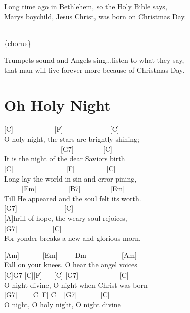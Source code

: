 \documentclass[
  letterpaper,
  twoside=false]{scrbook}
\begin{document}
Long time ago in Bethlehem, so the Holy Bible says, ~\\
Mary\textquotesingle s boychild, Jesus Christ, was born on Christmas
Day.

~\\
\{chorus\}

Trumpets sound and Angels sing...listen to what they say,\\
that man will live forever more because of Christmas Day.

\hypertarget{oh-holy-night}{%
\chapter{Oh Holy Night}\label{oh-holy-night}}

{[}C{]} ~ ~ ~ ~ ~ ~ ~{[}F{]} ~ ~ ~ ~ ~ ~ ~ ~{[}C{]}\\
O holy night, the stars are brightly shining;\\
\hspace*{0.333em} ~ ~ ~ ~ ~ ~ ~ ~ ~ ~{[}G7{]} ~ ~ ~ ~ ~{[}C{]}\\
It is the night of the dear Saviors birth\\
{[}C{]} ~ ~ ~ ~ ~ ~ ~ ~ ~{[}F{]} ~ ~ ~ ~ ~ {[}C{]}\\
Long lay the world in sin and error pining,\\
\hspace*{0.333em} ~ ~ ~ {[}Em{]} ~ ~ ~ ~ ~ {[}B7{]} ~ ~ ~ ~ ~{[}Em{]}\\
Till He appeared and the soul felt its worth.\\
{[}G7{]} ~ ~ ~ ~ ~ ~ ~ ~{[}C{]} ~ ~ ~ ~ ~\\
{[}A{]}hrill of hope, the weary soul rejoices,\\
\hspace*{0.333em} {[}G7{]} ~ ~ ~ ~ ~ ~{[}C{]} ~ ~ ~ ~ ~ ~ ~\\
For yonder breaks a new and glorious morn.

{[}Am{]} ~ ~ ~ ~{[}Em{]} ~ ~ ~Dm ~ ~ ~ ~ ~ ~{[}Am{]}\\
Fall on your knees, O hear the angel voices\\
{[}C{]}G7 {[}C{]}{[}F{]} ~ ~{[}C{]} {[}G7{]} ~ ~ ~ ~ ~ ~ ~{[}C{]}\\
O night divine, O night when Christ was born\\
{[}G7{]} ~ ~ {[}C{]}{[}F{]}{[}C{]} ~{[}G7{]} ~ ~ ~ ~{[}C{]}\\
O night, O holy night, O night divine
\end{document}
